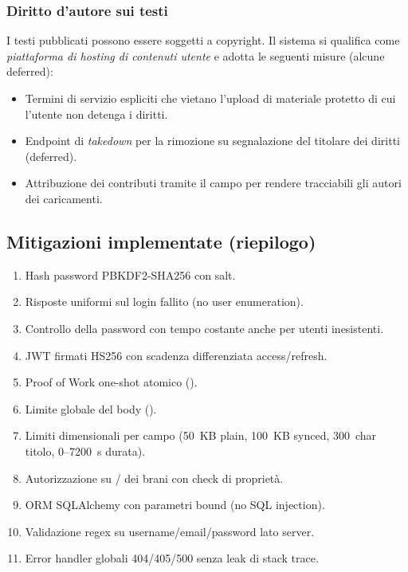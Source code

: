 \subsubsection{Diritto d'autore sui testi}
I testi pubblicati possono essere soggetti a copyright. Il sistema si
qualifica come \emph{piattaforma di hosting di contenuti utente} e adotta
le seguenti misure (alcune deferred):
\begin{itemize}
    \item Termini di servizio espliciti che vietano l'upload di materiale
    protetto di cui l'utente non detenga i diritti.
    \item Endpoint di \emph{takedown} per la rimozione su segnalazione del
    titolare dei diritti (deferred).
    \item Attribuzione dei contributi tramite il campo 
    per rendere tracciabili gli autori dei caricamenti.
\end{itemize}

\subsection{Mitigazioni implementate (riepilogo)}
\begin{enumerate}
    \item Hash password PBKDF2-SHA256 con salt.
    \item Risposte uniformi sul login fallito (no user enumeration).
    \item Controllo della password con tempo costante anche per utenti
    inesistenti.
    \item JWT firmati HS256 con scadenza differenziata access/refresh.
    \item Proof of Work one-shot atomico ().
    \item Limite globale del body ().
    \item Limiti dimensionali per campo (50~KB plain, 100~KB synced,
    300~char titolo, 0--7200~s durata).
    \item Autorizzazione su / dei brani con check di
    proprietà.
    \item ORM SQLAlchemy con parametri bound (no SQL injection).
    \item Validazione regex su username/email/password lato server.
    \item Error handler globali 404/405/500 senza leak di stack trace.
\end{enumerate}

